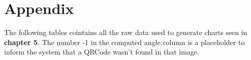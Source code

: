 \chapter{Appendix}
The following tables cointains all the raw data used to generate charts seen in \textbf{chapter 5}.
The number -1 in the computed angle column is a placeholder to inform the system that a QRCode wasn't found in that image. 
 

\restoregeometry
